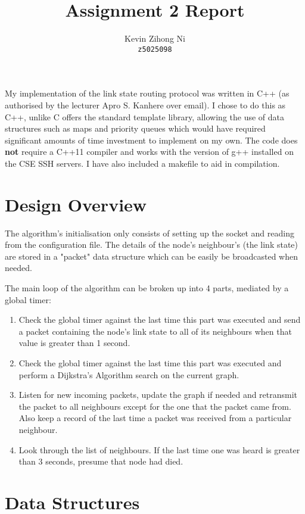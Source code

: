 \documentclass[a4paper]{article}
\title{Assignment 2 Report}
\author{Kevin Zihong Ni\\\texttt{z5025098}}
\begin{document}
\maketitle

My implementation of the link state routing protocol was written in C++ (as authorised by the lecturer Apro S. Kanhere
over email). I chose to do this as C++, unlike C offers the standard template library, allowing the use of data structures such as
maps and priority queues which would have required significant amounts of time investment to implement on my own. The code does 
\textbf{not} require a C++11 compiler and works with the version of g++ installed on the CSE SSH servers. I have also included
a makefile to aid in compilation.

\section{Design Overview}

The algorithm's initialisation only consists of setting up the socket and reading from the configuration file. The details of 
the node's neighbour's (the link state) are stored in a "packet" data structure which can be easily be broadcasted when needed.


The main loop of the algorithm can be broken up into 4 parts, mediated by a global timer: 
\begin{enumerate}
	\item Check the global timer against the last time this part was executed and send a packet containing the node's link state
		to all of its neighbours when that value is greater than 1 second. 
	\item Check the global timer against the last time this part was executed and perform a Dijkstra's Algorithm search on
		the current graph.
	\item Listen for new incoming packets, update the graph if needed and retransmit the packet to all neighbours except
		for the one that the packet came from. Also keep a record of the last time a packet was 
		received from a particular neighbour.
	\item Look through the list of neighbours. If the last time one was heard is greater than 3 seconds, presume that node
		had died.
\end{enumerate}

\section{Data Structures}
\end{document}
